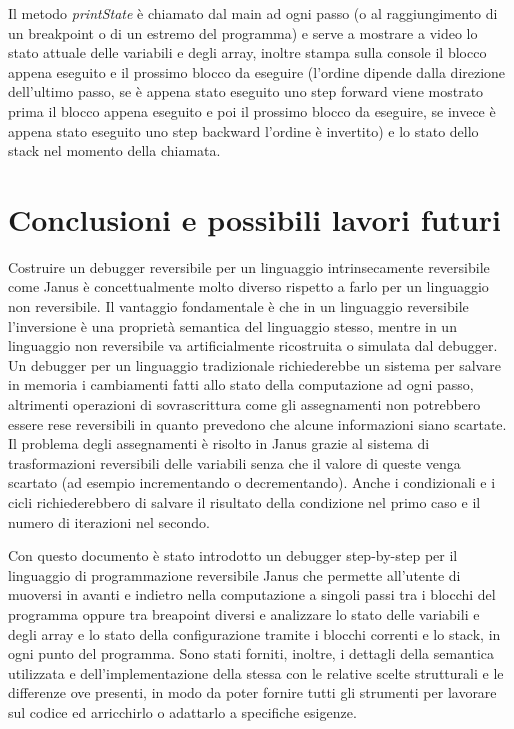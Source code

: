 \documentclass{article}
\theoremstyle{plain}
\theoremstyle{definition}
\theoremstyle{plain}
\begin{document}
Il metodo \emph{printState} è chiamato dal main ad ogni passo (o al raggiungimento di un breakpoint o di un estremo del programma) e serve a mostrare a video lo stato attuale delle variabili e degli array, inoltre stampa sulla console il blocco appena eseguito e il prossimo blocco da eseguire (l'ordine dipende dalla direzione dell'ultimo passo, se è appena stato eseguito uno step forward viene mostrato prima il blocco appena eseguito e poi il prossimo blocco da eseguire, se invece è appena stato eseguito uno step backward l'ordine è invertito) e lo stato dello stack nel momento della chiamata.

\section{Conclusioni e possibili lavori futuri}

Costruire un debugger reversibile per un linguaggio intrinsecamente reversibile come Janus è concettualmente molto diverso rispetto a farlo per un linguaggio non reversibile. Il vantaggio fondamentale è che in un linguaggio reversibile l'inversione è una proprietà semantica del linguaggio stesso, mentre in un linguaggio non reversibile va artificialmente ricostruita o simulata dal debugger. Un debugger per un linguaggio tradizionale richiederebbe un sistema per salvare in memoria i cambiamenti fatti allo stato della computazione ad ogni passo, altrimenti operazioni di sovrascrittura come gli assegnamenti non potrebbero essere rese reversibili in quanto prevedono che alcune informazioni siano scartate. Il problema degli assegnamenti è risolto in Janus grazie al sistema di trasformazioni reversibili delle variabili senza che il valore di queste venga scartato (ad esempio incrementando o decrementando). Anche i condizionali e i cicli richiederebbero di salvare il risultato della condizione nel primo caso e il numero di iterazioni nel secondo.
\medskip

Con questo documento è stato introdotto un debugger step-by-step per il linguaggio di programmazione reversibile Janus che permette all'utente di muoversi in avanti e indietro nella computazione a singoli passi tra i blocchi del programma oppure tra breapoint diversi e analizzare lo stato delle variabili e degli array e lo stato della configurazione tramite i blocchi correnti e lo stack, in ogni punto del programma. Sono stati forniti, inoltre, i dettagli della semantica utilizzata e dell'implementazione della stessa con le relative scelte strutturali e le differenze ove presenti, in modo da poter fornire tutti gli strumenti per lavorare sul codice ed arricchirlo o adattarlo a specifiche esigenze.
\medskip
\end{document}
